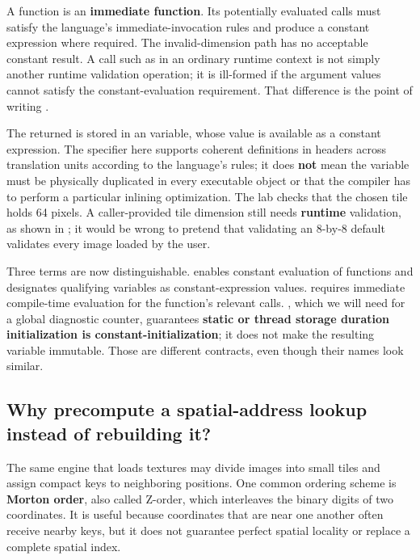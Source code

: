 A  function is an \textbf{immediate function}. Its potentially evaluated calls must satisfy the language's immediate-invocation rules and produce a constant expression where required. The invalid-dimension path has no acceptable constant result. A call such as  in an ordinary runtime context is not simply another runtime validation operation; it is ill-formed if the argument values cannot satisfy the constant-evaluation requirement. That difference is the point of writing .

The returned  is stored in an  variable, whose value is available as a constant expression. The  specifier here supports coherent definitions in headers across translation units according to the language's rules; it does \textbf{not} mean the variable must be physically duplicated in every executable object or that the compiler has to perform a particular inlining optimization. The lab checks that the chosen tile holds 64 pixels. A caller-provided tile dimension still needs \textbf{runtime} validation, as shown in ; it would be wrong to pretend that validating an 8-by-8 default validates every image loaded by the user.

Three terms are now distinguishable.  enables constant evaluation of functions and designates qualifying variables as constant-expression values.  requires immediate compile-time evaluation for the function's relevant calls. , which we will need for a global diagnostic counter, guarantees \textbf{static or thread storage duration initialization is constant-initialization}; it does not make the resulting variable immutable. Those are different contracts, even though their names look similar.

\subsection{Why precompute a spatial-address lookup instead of rebuilding it?}\label{05-engine-i-ch005-why-precompute-a-spatial-address-lookup-instead-of-rebuilding-it}

\hypertarget{05-engine-i-ch005-why-precompute-a-spatial-address-lookup-instead-of-rebuilding-it}{}

The same engine that loads textures may divide images into small tiles and assign compact keys to neighboring positions. One common ordering scheme is \textbf{Morton order}, also called Z-order, which interleaves the binary digits of two coordinates. It is useful because coordinates that are near one another often receive nearby keys, but it does not guarantee perfect spatial locality or replace a complete spatial index.

